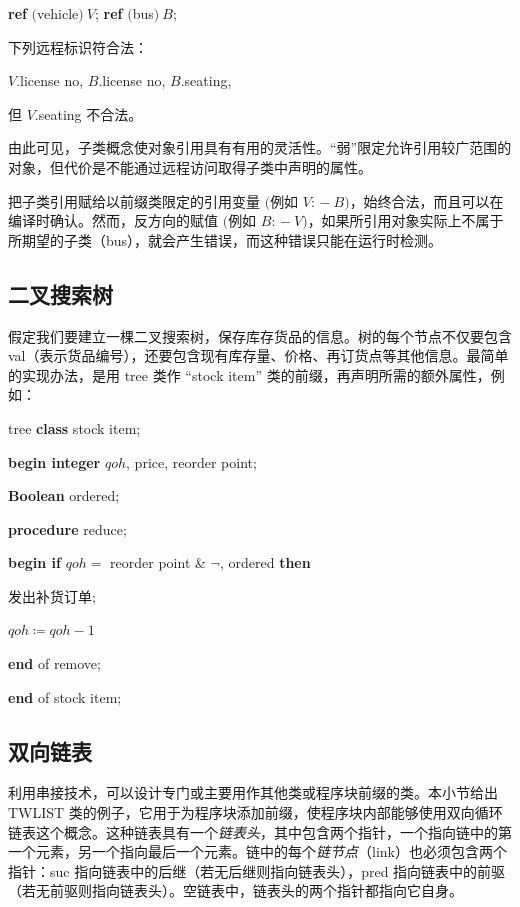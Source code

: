 \quad \quad \textbf{ref} $($vehicle$)\ V$; \textbf{ref} $($bus$)\ B$;

\quad 下列远程标识符合法：

\quad \quad $V$.license no, $B$.license no, $B$.seating,

\quad 但 $V$.seating 不合法。

\noindent
由此可见，子类概念使对象引用具有有用的灵活性。“弱”限定允许引用较广范围的对象，但代价是不能通过远程访问取得子类中声明的属性。

把子类引用赋给以前缀类限定的引用变量 $($例如 $V$: $-\ B)$，始终合法，而且可以在编译时确认。然而，反方向的赋值 $($例如 $B$: $-\ V)$，如果所引用对象实际上不属于所期望的子类（bus），就会产生错误，而这种错误只能在运行时检测。

\subsection{二叉搜索树}

假定我们要建立一棵二叉搜索树，保存库存货品的信息。树的每个节点不仅要包含 val（表示货品编号），还要包含现有库存量、价格、再订货点等其他信息。最简单的实现办法，是用 tree 类作 ``stock item'' 类的前缀，再声明所需的额外属性，例如：

\quad tree \textbf{class} stock item;

\quad \quad \textbf{begin integer} $qoh$, price, reorder point;

\quad \quad \quad \textbf{Boolean} ordered;

\quad \quad \quad \textbf{procedure} reduce;

\quad \quad \quad \quad \textbf{begin if} $qoh =$ reorder point \& $\neg$, ordered \textbf{then}

\quad \quad \quad \quad \quad 发出补货订单;

\quad \quad \quad \quad \quad $qoh \coloneq qoh -1$

\quad \quad \quad \quad \textbf{end} of remove;

\quad \quad \textbf{end} of stock item;

\subsection{双向链表}

利用串接技术，可以设计专门或主要用作其他类或程序块前缀的类。本小节给出 TWLIST 类的例子，它用于为程序块添加前缀，使程序块内部能够使用双向循环链表这个概念。这种链表具有一个\textit{链表头}，其中包含两个指针，一个指向链中的第一个元素，另一个指向最后一个元素。链中的每个\textit{链节点}（link）也必须包含两个指针：suc 指向链表中的后继（若无后继则指向链表头），pred 指向链表中的前驱（若无前驱则指向链表头）。空链表中，链表头的两个指针都指向它自身。


